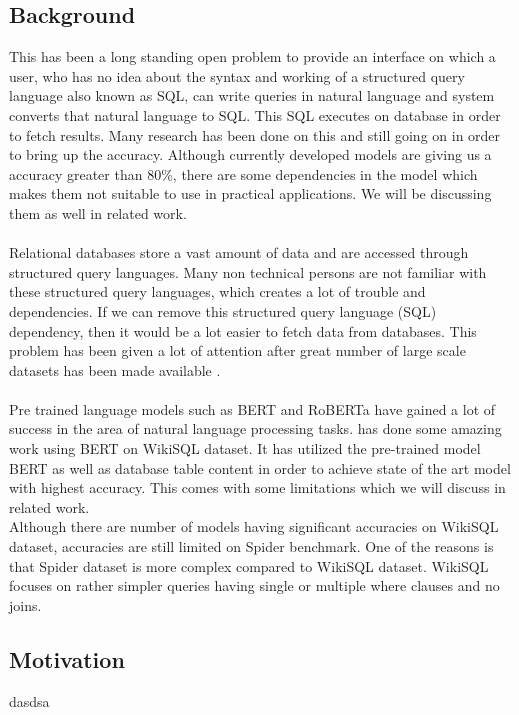 \documentclass[12pt]{article}
\begin{document}
\subsection{Background}
This has been a long standing open problem to provide an interface on which a user, who has no idea about the syntax and working of a structured query language also known as SQL, can write queries in natural language and system converts that natural language to SQL. This SQL executes on database in order to fetch results. Many research has been done on this and still going on in order to bring up the accuracy. Although currently developed models are giving us a accuracy greater than 80\%, there are some dependencies in the model which makes them not suitable to use in practical applications. We will be discussing them as well in related work.
\\ \\
 Relational databases store a vast amount of data and are accessed through structured query languages. Many non technical persons are not familiar with these structured query languages, which creates a lot of trouble and dependencies. If we can remove this structured query language (SQL) dependency, then it would be a lot easier to fetch data from databases. This problem has been given a lot of attention after great number of  large scale datasets has been made available \cite{zhong2017seq2sql} \cite{setlur2019inferencing} \cite{yu2018spider}. 
\\ \\
Pre trained language models such as BERT \cite{devlin2018bert} and RoBERTa \cite{liu2019roberta}  have gained a lot of success in the area of natural language processing tasks. \cite{guo2019content} has done some amazing work using BERT on WikiSQL dataset. It has utilized the pre-trained model BERT as well as database table content in order to achieve state of the art model with highest accuracy. This comes with some limitations which we will discuss in related work. 
\\Although there are number of models having significant accuracies on WikiSQL dataset, accuracies are still limited on Spider benchmark\cite{yu2018spider}. One of the reasons is that Spider dataset is more complex compared to WikiSQL dataset. WikiSQL focuses on rather simpler queries having single or multiple where clauses and no joins.

\subsection{Motivation}
dasdsa
\end{document}
